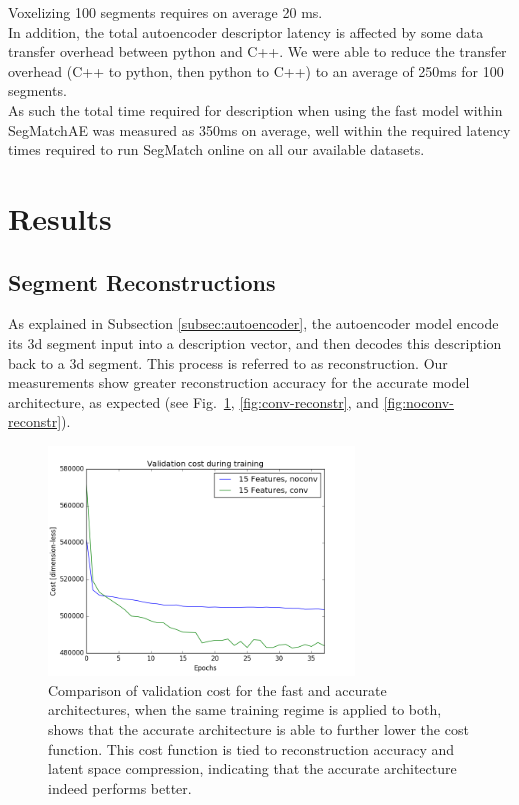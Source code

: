 Voxelizing 100 segments requires on average 20 ms.\\

In addition, the total autoencoder descriptor latency is affected by some data transfer overhead between python and C++. We were able to reduce the transfer overhead (C++ to python, then python to C++) to an average of 250ms for 100 segments.\\

As such the total time required for description when using the fast model within SegMatchAE was measured as 350ms on average, well within the required latency times required to run SegMatch online on all our available datasets.\\

\section{Results}
\label{sec:ae-results}

\subsection{Segment Reconstructions}

As explained in Subsection \ref{subsec:autoencoder}, the autoencoder model encode its 3d segment input into a description vector, and then decodes this description back to a 3d segment. This process is referred to as reconstruction. Our measurements show greater reconstruction accuracy for the accurate model architecture, as expected (see Fig.~\ref{fig:trainingcost}, \ref{fig:conv-reconstr}, and \ref{fig:noconv-reconstr}).\\

\begin{figure}
  \centering
  \includegraphics[width=3.2in]{images/trainingcost.png}
  \caption{Comparison of validation cost for the fast and accurate architectures, when the same training regime is applied to both, shows that the accurate architecture is able to further lower the cost function. This cost function is tied to reconstruction accuracy and latent space compression, indicating that the accurate architecture indeed performs better.}
  \label{fig:trainingcost}
\end{figure}
 
